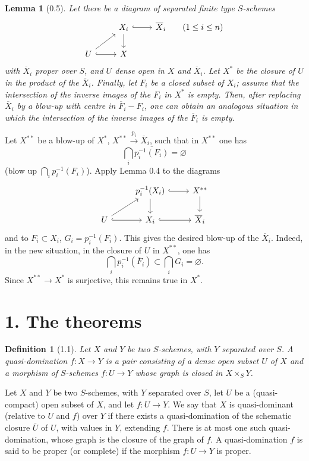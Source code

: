 \documentclass[10pt,a4paper]{article}
\theoremstyle{deligne}
\newtheorem*{lemma*}{Lemma}
\newtheorem*{definition*}{Definition}
\begin{document}
\begin{lemma*}[0.5]
Let there be a diagram of separated finite type \(S\)-schemes
\[
\begin{tikzcd}[column sep=2.4em,row sep=1.6em]
& X_i \arrow[r,hook] \arrow[d] & \overline X_i \qquad (1\le i\le n) \\
U \arrow[ur] \arrow[r,hook] & X
\end{tikzcd}
\]
with \(\overline X_i\) proper over \(S\), and \(U\) dense open in \(X\) and \(\overline X_i\). Let \(X^*\) be the closure of \(U\) in the product of the \(\overline X_i\). Finally, let \(F_i\) be a closed subset of \(X_i\); assume that the intersection of the inverse images of the \(F_i\) in \(X^*\) is empty. Then, after replacing \(\overline X_i\) by a blow-up with centre in \(\overline F_i-F_i\), one can obtain an analogous situation in which the intersection of the inverse images of the \(\overline F_i\) is empty.
\end{lemma*}

Let \(X^{**}\) be a blow-up of \(X^*\), \(X^{**}\xrightarrow{p_i}\overline X_i\), such that in \(X^{**}\) one has
\[
\bigcap_i \overline{p_i^{-1}(F_i)}=\varnothing
\]
(blow up \(\bigcap_i p_i^{-1}(F_i)\)). Apply Lemma 0.4 to the diagrams
\[
\begin{tikzcd}[column sep=2.5em,row sep=1.6em]
& p_i^{-1}(X_i) \arrow[r,hook] \arrow[d] & X^{**} \arrow[d] \\
U \arrow[ur] \arrow[r,hook] & X_i \arrow[r,hook] & \overline X_i
\end{tikzcd}
\]
and to \(F_i\subset X_i\), \(G_i=p_i^{-1}(F_i)\). This gives the desired blow-up of the \(\overline X_i\). Indeed, in the new situation, in the closure of \(U\) in \(X^{**}\), one has
\[
\bigcap_i p_i^{-1}(\overline F_i)\subset \bigcap_i G_i=\varnothing.
\]
Since \(X^{**}\to X^*\) is surjective, this remains true in \(X^*\).

\section*{1. The theorems}

\begin{definition*}[1.1]
Let \(X\) and \(Y\) be two \(S\)-schemes, with \(Y\) separated over \(S\). A quasi-domination \(f:X\to Y\) is a pair consisting of a dense open subset \(U\) of \(X\) and a morphism of \(S\)-schemes \(f:U\to Y\) whose graph is closed in \(X\times_S Y\).
\end{definition*}

Let \(X\) and \(Y\) be two \(S\)-schemes, with \(Y\) separated over \(S\), let \(U\) be a (quasi-compact) open subset of \(X\), and let \(f:U\to Y\). We say that \(X\) is quasi-dominant (relative to \(U\) and \(f\)) over \(Y\) if there exists a quasi-domination of the schematic closure \(\overline U\) of \(U\), with values in \(Y\), extending \(f\). There is at most one such quasi-domination, whose graph is the closure of the graph of \(f\). A quasi-domination \(f\) is said to be proper (or complete) if the morphism \(f:U\to Y\) is proper.
\end{document}
